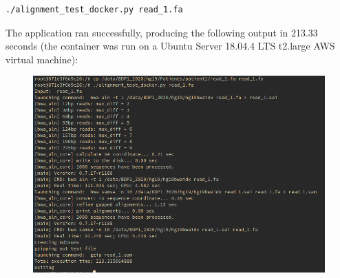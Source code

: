 \documentclass{article}
\begin{document}
\begin{lstlisting}
./alignment_test_docker.py read_1.fa
\end{lstlisting}

The application ran successfully, producing the following output in 213.33 seconds (the container was run on a Ubuntu Server 18.04.4 LTS t2.large AWS virtual machine):

\begin{figure}[!h]
    \center
    \includegraphics[width=\textwidth]{./images/docker_test_out.png}
\end{figure}
\end{document}
